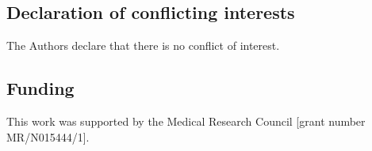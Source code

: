 \documentclass[AMA,STIX1COL]{WileyNJD-v2}
\begin{document}
\subsection*{Declaration of conflicting interests}

The Authors declare that there is no conflict of interest.

\subsection*{Funding}

This work was supported by the Medical Research Council [grant number MR/N015444/1].

%

\end{document}

